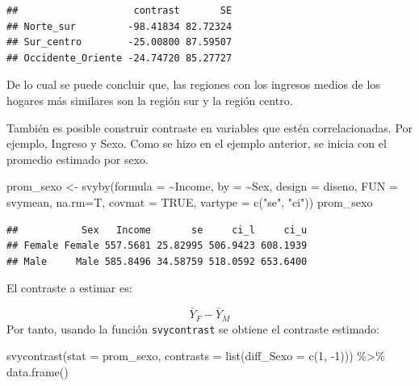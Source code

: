 \documentclass[
  12pt,
]{book}
\newenvironment{Shaded}{\begin{snugshade}}{\end{snugshade}}
\newcommand{\AttributeTok}[1]{\textcolor[rgb]{0.77,0.63,0.00}{#1}}
\newcommand{\ConstantTok}[1]{\textcolor[rgb]{0.00,0.00,0.00}{#1}}
\newcommand{\DecValTok}[1]{\textcolor[rgb]{0.00,0.00,0.81}{#1}}
\newcommand{\FunctionTok}[1]{\textcolor[rgb]{0.00,0.00,0.00}{#1}}
\newcommand{\NormalTok}[1]{#1}
\newcommand{\OtherTok}[1]{\textcolor[rgb]{0.56,0.35,0.01}{#1}}
\newcommand{\SpecialCharTok}[1]{\textcolor[rgb]{0.00,0.00,0.00}{#1}}
\newcommand{\StringTok}[1]{\textcolor[rgb]{0.31,0.60,0.02}{#1}}
\begin{document}
\begin{verbatim}
##                    contrast       SE
## Norte_sur         -98.41834 82.72324
## Sur_centro        -25.00800 87.59507
## Occidente_Oriente -24.74720 85.27727
\end{verbatim}

De lo cual se puede concluir que, las regiones con los ingresos medios de los hogares más similares son la región sur y la región centro.

También es posible construir contraste en variables que estén correlacionadas. Por ejemplo, Ingreso y Sexo. Como se hizo en el ejemplo anterior, se inicia con el promedio estimado por sexo.

\begin{Shaded}
\begin{Highlighting}[]
\NormalTok{prom\_sexo }\OtherTok{\textless{}{-}} \FunctionTok{svyby}\NormalTok{(}\AttributeTok{formula =} \SpecialCharTok{\textasciitilde{}}\NormalTok{Income, }
                   \AttributeTok{by =} \SpecialCharTok{\textasciitilde{}}\NormalTok{Sex, }
                   \AttributeTok{design =}\NormalTok{ diseno,}
                   \AttributeTok{FUN =}\NormalTok{ svymean, }
                   \AttributeTok{na.rm=}\NormalTok{T,}
                   \AttributeTok{covmat =} \ConstantTok{TRUE}\NormalTok{,}
                   \AttributeTok{vartype =} \FunctionTok{c}\NormalTok{(}\StringTok{"se"}\NormalTok{, }\StringTok{"ci"}\NormalTok{))}
\NormalTok{prom\_sexo}
\end{Highlighting}
\end{Shaded}

\begin{verbatim}
##           Sex   Income       se     ci_l     ci_u
## Female Female 557.5681 25.82995 506.9423 608.1939
## Male     Male 585.8496 34.58759 518.0592 653.6400
\end{verbatim}

El contraste a estimar es:

\[ \bar{Y}_{F} - \bar{Y}_{M}\]
Por tanto, usando la función \texttt{svycontrast} se obtiene el contraste estimado:

\begin{Shaded}
\begin{Highlighting}[]
\FunctionTok{svycontrast}\NormalTok{(}\AttributeTok{stat =}\NormalTok{ prom\_sexo,}
            \AttributeTok{contrasts =} \FunctionTok{list}\NormalTok{(}\AttributeTok{diff\_Sexo =} \FunctionTok{c}\NormalTok{(}\DecValTok{1}\NormalTok{, }\SpecialCharTok{{-}}\DecValTok{1}\NormalTok{))) }\SpecialCharTok{\%\textgreater{}\%} 
            \FunctionTok{data.frame}\NormalTok{()}
\end{Highlighting}
\end{Shaded}
\end{document}
